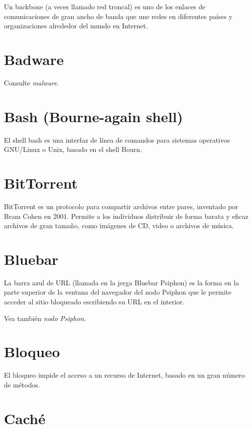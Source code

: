 \documentclass[10pt,a5paper,twoside,,]{book}
\begin{document}
Un backbone (a veces llamado red troncal) es uno de los enlaces de
comunicaciones de gran ancho de banda que une redes en diferentes países
y organizaciones alrededor del mundo en Internet.

\section{Badware}\label{badware}

Consulte \emph{malware}.

\section{Bash (Bourne-again shell)}\label{bash-bourne-again-shell}

El shell bash es una interfaz de línea de comandos para sistemas
operativos GNU/Linux o Unix, basado en el shell Bourn.

\section{BitTorrent}\label{bittorrent-1}

BitTorrent es un protocolo para compartir archivos entre pares,
inventado por Bram Cohen en 2001. Permite a los individuos distribuir de
forma barata y eficaz archivos de gran tamaño, como imágenes de CD,
video o archivos de música.

\section{Bluebar}\label{bluebar}

La barra azul de URL (llamada en la jerga Bluebar Psiphon) es la forma
en la parte superior de la ventana del navegador del nodo Psiphon que le
permite acceder al sitio bloqueado escribiendo su URL en el interior.

Vea también \emph{nodo Psiphon}.

\section{Bloqueo}\label{bloqueo}

El bloqueo impide el acceso a un recurso de Internet, basado en un gran
número de métodos.

\section{Caché}\label{cachuxe9}
\end{document}
